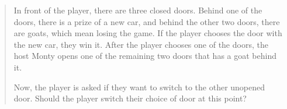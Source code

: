 \begin{quotation}
	In front of the player, there are three closed doors. Behind one of the doors, there is a prize of a new car, and behind the other two doors, there are goats, which mean losing the game. If the player chooses the door with the new car, they win it. After the player chooses one of the doors, the host Monty opens one of the remaining two doors that has a goat behind it.

	Now, the player is asked if they want to switch to the other unopened door.
	Should the player switch their choice of door at this point?
\end{quotation}

